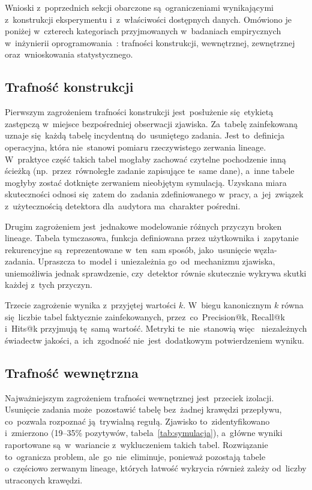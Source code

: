 \documentclass[polish,master,a4paper,oneside]{ppfcmthesis}
\renewcommand{\_}{\origtextunderscore\ifmmode\else\allowbreak\fi}
\begin{document}
Wnioski z~poprzednich sekcji obarczone są~ograniczeniami wynikającymi
z~konstrukcji eksperymentu i~z~właściwości dostępnych danych. Omówiono je~
poniżej w~czterech kategoriach przyjmowanych w~badaniach empirycznych
w~inżynierii oprogramowania~\cite{Wohlin2012}: trafności konstrukcji, wewnętrznej, zewnętrznej
oraz~wnioskowania statystycznego.

\subsection{Trafność konstrukcji}

Pierwszym zagrożeniem trafności konstrukcji jest~posłużenie się~etykietą
zastępczą w~miejsce bezpośredniej obserwacji zjawiska. Za~tabelę zainfekowaną
uznaje się~każdą tabelę incydentną do~usuniętego zadania. Jest to~definicja
operacyjna, która nie~stanowi pomiaru rzeczywistego zerwania lineage.
W~praktyce część takich tabel mogłaby zachować czytelne pochodzenie inną
ścieżką (np.~przez~równoległe zadanie zapisujące te~same dane), a~inne tabele
mogłyby zostać dotknięte zerwaniem nieobjętym symulacją. Uzyskana miara
skuteczności odnosi się~zatem do~zadania zdefiniowanego w~pracy, a~jej~związek
z~użytecznością detektora dla~audytora ma~charakter pośredni.

Drugim zagrożeniem jest~jednakowe modelowanie różnych przyczyn broken lineage.
Tabela tymczasowa, funkcja definiowana przez użytkownika i~zapytanie rekurencyjne
są~reprezentowane w~ten~sam sposób, jako~usunięcie węzła-zadania. Upraszcza
to~model i~uniezależnia go~od~mechanizmu zjawiska, uniemożliwia jednak
sprawdzenie, czy~detektor równie skutecznie wykrywa skutki każdej z~tych przyczyn.

Trzecie zagrożenie wynika z~przyjętej wartości $k$. W~biegu kanonicznym
$k$ równa się~liczbie tabel faktycznie zainfekowanych, przez~co~Precision@k,
Recall@k i~Hits@k przyjmują tę~samą wartość. Metryki te~nie~stanowią więc~
niezależnych świadectw jakości, a~ich~zgodność nie~jest~dodatkowym
potwierdzeniem wyniku.

\subsection{Trafność wewnętrzna}

Najważniejszym zagrożeniem trafności wewnętrznej jest~przeciek izolacji.
Usunięcie zadania może~pozostawić tabelę bez~żadnej krawędzi przepływu,
co~pozwala rozpoznać ją~trywialną regułą. Zjawisko to~zidentyfikowano
i~zmierzono (19--35\% pozytywów, tabela~\ref{tab:symulacja}), a~główne wyniki
raportowane są~w~wariancie z~wykluczeniem takich tabel. Rozwiązanie to~ogranicza
problem, ale~go~nie~eliminuje, ponieważ pozostają tabele o~częściowo zerwanym
lineage, których łatwość wykrycia również zależy od~liczby utraconych krawędzi.
\end{document}
